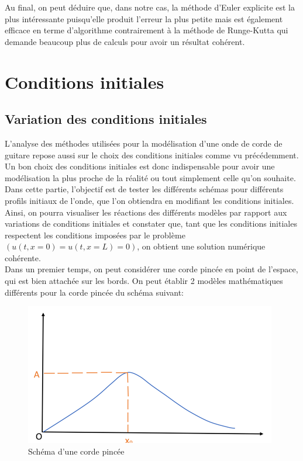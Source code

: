 Au final, on peut déduire que, dans notre cas, la méthode d'Euler explicite est la plus intéressante puisqu'elle produit l'erreur la plus petite mais est également efficace en terme d'algorithme contrairement à la méthode de Runge-Kutta qui demande beaucoup plus de calculs pour avoir un résultat cohérent.



\section{Conditions initiales}

\subsection{Variation des conditions initiales}


L'analyse des méthodes utilisées pour la modélisation d'une onde  de corde de guitare repose aussi sur le choix des conditions initiales comme vu précédemment.
Un bon choix des conditions initiales est donc indispensable pour avoir une modélisation la plus proche de la réalité ou tout simplement celle qu'on souhaite.\\


Dans cette partie, l'objectif est de tester les différents schémas pour différents profils initiaux de l'onde, que l'on obtiendra en modifiant les conditions initiales. \\

Ainsi, on pourra visualiser les réactions des différents modèles par rapport aux variations de conditions initiales et constater que, tant que les conditions initiales respectent les conditions imposées par le problème $(u(t,x=0)=u(t,x=L)=0)$, on obtient une solution numérique cohérente.\\

Dans un premier temps, on peut considérer une corde pincée en point de l'espace, qui est bien attachée sur les bords.
On peut établir 2 modèles mathématiques différents pour la corde pincée du schéma suivant:

\begin{figure}[H]
\centering
\includegraphics[scale=1]{image2.png}
\caption{Schéma d'une corde pincée}
\label{fig1}
\end{figure}



